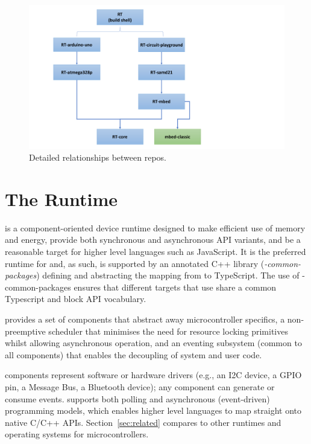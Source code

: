 \begin{figure}[t]
    \includegraphics[width=4.5in]{codalFig.pdf}
    \caption{\label{fig:codal}Detailed relationships between \CO repos.}
\end{figure}

\section{The \CO Runtime}
\label{sec:codal}

\CO is a component-oriented device runtime designed to make efficient use of memory and energy, provide both synchronous and asynchronous API variants, and be a reasonable target for higher level languages such as JavaScript.  It is the preferred runtime
for \MC and, as such, is supported by an annotated C++ library (\emph{\MCN-common-packages}) defining and abstracting
the mapping from \CO to TypeScript. The use of \MCN-common-packages ensures that different \MC targets that 
use \CO share a common Typescript and block API vocabulary.

\CO provides a set of components that abstract away microcontroller specifics, a non-preemptive scheduler that minimises the need for resource locking primitives whilst allowing asynchronous operation, and an eventing subsystem (common to all components) that enables the decoupling of system and user code.

\CO components represent software or hardware drivers (e.g., an I2C device, a GPIO pin, a Message Bus, a Bluetooth device); any component can generate or consume events. \CO supports both polling and asynchronous (event-driven) programming models, which enables higher level languages to map straight onto native C/C++ APIs. Section~\ref{sec:related} compares \CO to other runtimes and operating systems for microcontrollers.



